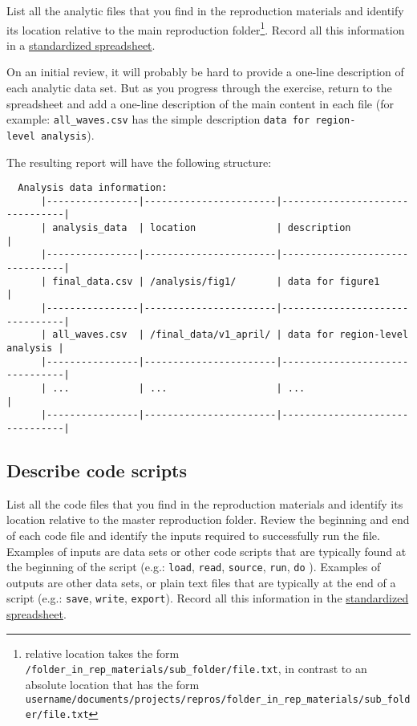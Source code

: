 \documentclass[]{book}
\begin{document}
List all the analytic files that you find in the reproduction materials and identify its location relative to the main reproduction folder\footnote{relative location takes the form \texttt{/folder\_in\_rep\_materials/sub\_folder/file.txt}, in contrast to an absolute location that has the form \texttt{username/documents/projects/repros/folder\_in\_rep\_materials/sub\_folder/file.txt}}. Record all this information in a \href{https://docs.google.com/spreadsheets/d/1LUIdVFH0OfR70C7z07TYeE-uWzKI_JIeWUMaYhqEKK0/edit\#gid=1299317837\&range=A1}{standardized spreadsheet}.

On an initial review, it will probably be hard to provide a one-line description of each analytic data set. But as you progress through the exercise, return to the spreadsheet and add a one-line description of the main content in each file (for example: \texttt{all\_waves.csv} has the simple description \texttt{data\ for\ region-level\ analysis}).

The resulting report will have the following structure:

\begin{verbatim}
  Analysis data information:
      |----------------|-----------------------|--------------------------------|
      | analysis_data  | location              | description                    |
      |----------------|-----------------------|--------------------------------|
      | final_data.csv | /analysis/fig1/       | data for figure1               |
      |----------------|-----------------------|--------------------------------|
      | all_waves.csv  | /final_data/v1_april/ | data for region-level analysis |
      |----------------|-----------------------|--------------------------------|
      | ...            | ...                   | ...                            |
      |----------------|-----------------------|--------------------------------|
\end{verbatim}

\hypertarget{describe-code-scripts}{%
\subsection{Describe code scripts}\label{describe-code-scripts}}

List all the code files that you find in the reproduction materials and identify its location relative to the master reproduction folder. Review the beginning and end of each code file and identify the inputs required to successfully run the file. Examples of inputs are data sets or other code scripts that are typically found at the beginning of the script (e.g.: \texttt{load}, \texttt{read}, \texttt{source}, \texttt{run}, \texttt{do} ). Examples of outputs are other data sets, or plain text files that are typically at the end of a script (e.g.: \texttt{save}, \texttt{write}, \texttt{export}). Record all this information in the \href{https://docs.google.com/spreadsheets/d/1LUIdVFH0OfR70C7z07TYeE-uWzKI_JIeWUMaYhqEKK0/edit\#gid=1617799822\&range=A1}{standardized spreadsheet}.
\end{document}
